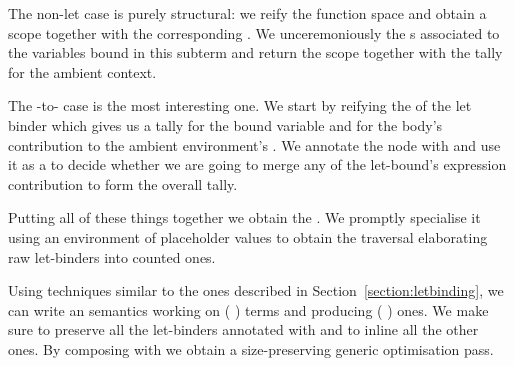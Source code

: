 The non-let case is purely structural: we reify the  function
space and obtain a scope together with the corresponding . We
unceremoniously  the s associated to the variables
bound in this subterm and return the scope together with the tally for
the ambient context.

\begin{agdasnippet}
\end{agdasnippet}

The -to- case is the most
interesting one. We start by reifying the  of the let binder which
gives us a tally  for the bound variable and  for the body's
contribution to the ambient environment's . We annotate the node
with  and use it as a  to decide whether we are going to
merge any of the let-bound's expression contribution  to form the
overall tally.

\begin{agdasnippet}
\end{agdasnippet}

Putting all of these things together we obtain the  .
We promptly specialise it using an environment of placeholder values to obtain
the traversal  elaborating raw let-binders into counted ones.

\begin{agdasnippet}
\end{agdasnippet}

Using techniques similar to the ones described in Section~\ref{section:letbinding},
we can write an  semantics working on {(  )} terms
and producing {(  )} ones. We make sure to preserve all the
let-binders annotated with  and to inline all the other ones. By composing
 with  we obtain a size-preserving generic optimisation pass.
